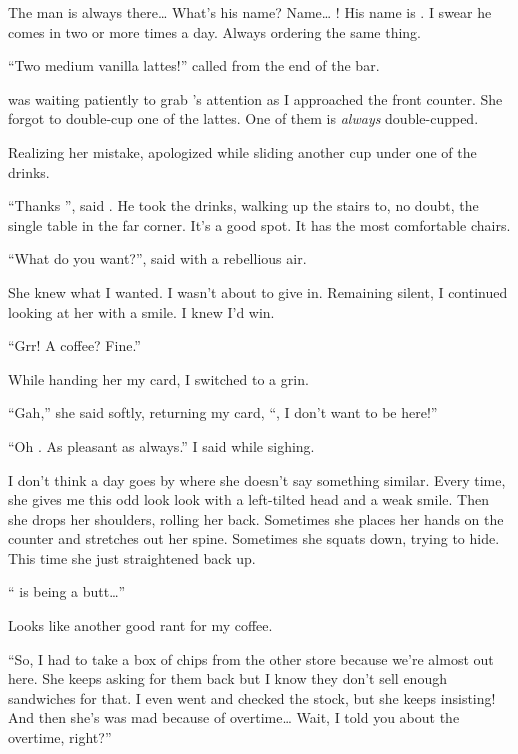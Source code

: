 \noindent
The man is always there\ldots{} What's his name? Name\ldots{} \dameon!
His name is \dameon. I swear he comes in two or more times a day.
Always ordering the same thing.
\VV


``Two medium vanilla lattes!'' \april{} called from the end of the bar.
\VV


\noindent
\dameon{} was waiting patiently to grab \april's attention
as I approached the front counter.
She forgot to double-cup one of the lattes.
One of them is \textit{always} double-cupped.
\VV


\noindent
Realizing her mistake, \april{} apologized while sliding another cup
under one of the drinks.
\VV


``Thanks \april'', said \dameon{}.
He took the drinks, walking up the stairs to, no doubt, the single table
in the far corner.  It's a good spot. It has the most comfortable chairs.
\VV


``What do you want?'', \april{} said with a rebellious air.
\VV


\noindent
She knew what I wanted. I wasn't about to give in.
Remaining silent, I continued looking at her with a smile.
I knew I'd win.
\VV


``Grr! A coffee? Fine.''
\VV


\noindent
While handing her my card, I switched to a grin.
\VV


``Gah,'' she said softly, returning my card,
``\josh, I don't want to be here!''


``Oh \april. As pleasant as always.''  I said while sighing.
\VV


\noindent
I don't think a day goes by where she doesn't say something similar.
Every time, she gives me this odd look look with a left-tilted head
and a weak smile.  Then she drops her shoulders, rolling her back.
Sometimes she places her hands on the counter and stretches out her spine.
Sometimes she squats down, trying to hide.
This time she just straightened back up.
\VV


``\jasmine{} is being a butt\ldots''
\VV


\noindent
Looks like another good rant for my coffee.
\VV


``So, I had to take a box of chips from the other store
because we're almost out here.  She keeps asking for them back
but I know they don't sell enough sandwiches for that.
I even went and checked the stock, but she keeps insisting!
And then she's was mad because of overtime\ldots{}
Wait, I told you about the overtime, right?''
\VV


